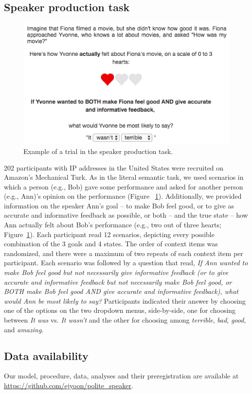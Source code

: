 \documentclass[9pt,twocolumn,twoside,lineno]{main_class_file}
\begin{document}
{\subsection*{Speaker production task}\label{speaker-production-task}

\begin{figure}[!h]
\begin{center}
\includegraphics[width=0.8\columnwidth]{fig/screenshot}
\caption{Example of a trial in the speaker production task.}\label{fig:screenshot}
\end{center}
\end{figure}

202 participants with IP addresses in the United States were recruited
on Amazon's Mechanical Turk. As in the literal semantic task, we
used scenarios in which a person (e.g., Bob) gave some performance and
asked for another person (e.g., Ann)'s opinion on the performance
(Figure ~\ref{fig:screenshot}). Additionally, we provided information on
the speaker Ann's goal -- to make Bob feel good, or to give as accurate
and informative feedback as possible, or both -- and the true state --
how Ann actually felt about Bob's performance (e.g., two out of three
hearts;
Figure~\ref{fig:screenshot}). Each participant read 12 scenarios,
depicting every possible combination of the 3 goals and 4 states.
The order of context items was randomized, and there were a maximum of
two repeats of each context item per participant. Each scenario was
followed by a question that read, \emph{If Ann wanted to make Bob
feel good but not necessarily give informative feedback (or to give
accurate and informative feedback but not necessarily make Bob feel
good, or BOTH make Bob feel good AND give accurate and informative
feedback), what would Ann be most likely to say?} Participants indicated
their answer by choosing one of the options on the two dropdown menus,
side-by-side, one for choosing between \emph{It was} vs. \emph{It
wasn't} and the other for choosing among \emph{terrible}, \emph{bad},
\emph{good}, and \emph{amazing.}

\subsection*{Data availability}\label{data-availability}

Our model, procedure, data, analyses and their preregistration
are available at \url{https://github.com/ejyoon/polite_speaker}.

}
\end{document}
